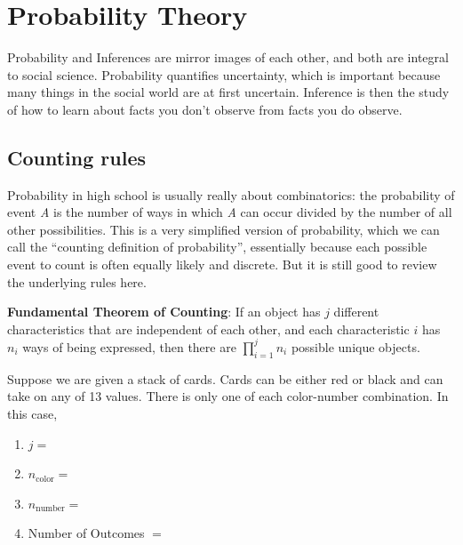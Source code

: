 \documentclass[
]{book}
\begin{document}
\setcounter{chapter}{4}


\hypertarget{probability-theory}{%
\chapter{Probability Theory}\label{probability-theory}}

Probability and Inferences are mirror images of each other, and both are integral to social science. Probability quantifies uncertainty, which is important because many things in the social world are at first uncertain. Inference is then the study of how to learn about facts you don't observe from facts you do observe.

\hypertarget{counting-rules}{%
\section{Counting rules}\label{counting-rules}}

Probability in high school is usually really about combinatorics: the probability of event \emph{A} is the number of ways in which \emph{A} can occur divided by the number of all other possibilities. This is a very simplified version of probability, which we can call the ``counting definition of probability'', essentially because each possible event to count is often equally likely and discrete. But it is still good to review the underlying rules here.

\textbf{Fundamental Theorem of Counting}: If an object has \(j\) different characteristics that are independent of each other, and each characteristic \(i\) has \(n_i\) ways of being expressed, then there are \(\prod_{i = 1}^j n_i\) possible unique objects.

\begin{example}
\protect\hypertarget{exm:countingrules}{}\label{exm:countingrules}

Suppose we are given a stack of cards. Cards can be either red or black and can take on any of 13 values. There is only one of each color-number combination. In this case,

\begin{enumerate}
\def\labelenumi{\arabic{enumi}.}
\item
  \(j =\)
\item
  \(n_{\text{color}} =\)
\item
  \(n_{\text{number}} =\)
\item
  Number of Outcomes \(=\)
\end{enumerate}

\end{example}
\end{document}
